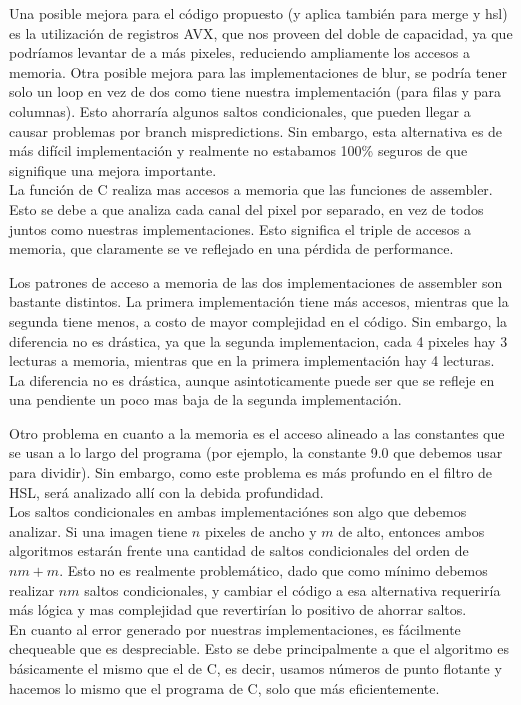 Una posible mejora para el código propuesto (y aplica también para merge y hsl) es la utilización de registros AVX, que nos proveen del doble de capacidad, ya que podríamos levantar de a más pixeles, reduciendo ampliamente los accesos a memoria.
Otra posible mejora para las implementaciones de blur, se podría tener solo un loop en vez de dos como tiene nuestra implementación (para filas y para columnas). Esto ahorraría algunos saltos condicionales, que pueden llegar a causar problemas por branch mispredictions.
Sin embargo, esta alternativa es de más difícil implementación y realmente no estabamos 100\% seguros de que signifique una mejora importante.
\\

La función de C realiza mas accesos a memoria que las funciones de assembler. Esto se debe a que analiza cada canal del pixel por separado, en vez de todos juntos como nuestras implementaciones. Esto significa el triple de accesos a memoria, que claramente se ve reflejado en una pérdida de performance.

Los patrones de acceso a memoria de las dos implementaciones de assembler son bastante distintos. La primera implementación tiene más accesos, mientras que la segunda tiene menos, a costo de mayor complejidad en el código. Sin embargo, la diferencia no es drástica, ya que la segunda implementacion, cada 4 pixeles hay 3 lecturas a memoria, mientras que en la primera implementación hay 4 lecturas. La diferencia no es drástica, aunque asintoticamente puede ser que se refleje en una pendiente un poco mas baja de la segunda implementación.

Otro problema en cuanto a la memoria es el acceso alineado a las constantes que se usan a lo largo del programa (por ejemplo, la constante 9.0 que debemos usar para dividir). Sin embargo, como este problema es más profundo en el filtro de HSL, será analizado allí con la debida profundidad.
\\

Los saltos condicionales en ambas implementaciónes son algo que debemos analizar. Si una imagen tiene $n$ pixeles de ancho y $m$ de alto, entonces ambos algoritmos estarán frente una cantidad de saltos condicionales del orden de $nm+m$.
Esto no es realmente problemático, dado que como mínimo debemos realizar $nm$ saltos condicionales, y cambiar el código a esa alternativa requeriría más lógica y mas complejidad que revertirían lo positivo de ahorrar saltos.
\\

En cuanto al error generado por nuestras implementaciones, es fácilmente chequeable que es despreciable. Esto se debe principalmente a que el algoritmo es básicamente el mismo que el de C, es decir, usamos números de punto flotante y hacemos lo mismo que el programa de C, solo que más eficientemente.














